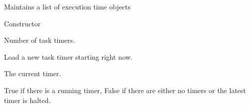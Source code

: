 \documentclass[letterpaper,10pt,english]{sphinxmanual}
\begin{document}
\begin{fulllineitems}
\label{\detokenize{ref/util/ExecTimer:TotalDepth.util.ExecTimer.ExecTimerList}}
Maintains a list of execution time objects

\begin{fulllineitems}
\label{\detokenize{ref/util/ExecTimer:TotalDepth.util.ExecTimer.ExecTimerList.__init__}}
Constructor

\end{fulllineitems}


\begin{fulllineitems}
\label{\detokenize{ref/util/ExecTimer:TotalDepth.util.ExecTimer.ExecTimerList.__len__}}
Number of task timers.

\end{fulllineitems}


\begin{fulllineitems}
\label{\detokenize{ref/util/ExecTimer:TotalDepth.util.ExecTimer.ExecTimerList.startNewTimer}}
Load a new task timer starting right now.

\end{fulllineitems}


\begin{fulllineitems}
\label{\detokenize{ref/util/ExecTimer:TotalDepth.util.ExecTimer.ExecTimerList.timer}}
The current timer.

\end{fulllineitems}


\begin{fulllineitems}
\label{\detokenize{ref/util/ExecTimer:TotalDepth.util.ExecTimer.ExecTimerList.hasActiveTimer}}
True if there is a running timer, False if there are either no timers
or the latest timer is halted.


\end{fulllineitems}
\end{fulllineitems}
\end{document}
